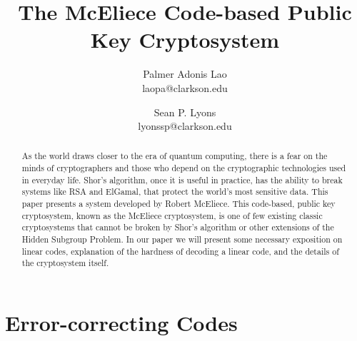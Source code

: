 \documentclass[15pt]{article}
\theoremstyle{definition}
\begin{document}
\title{The McEliece Code-based Public Key Cryptosystem}

\author{Palmer Adonis Lao\\
 laopa@clarkson.edu\\
\and
Sean P. Lyons\\
lyonssp@clarkson.edu\\}
\maketitle
\thispagestyle{empty}

\begin{abstract}
As the world draws closer to the era of quantum computing, there is a fear on the minds of cryptographers and those who depend on the cryptographic technologies used in everyday life. Shor's algorithm, once it is useful in practice, has the ability to break systems like RSA and ElGamal, that protect the world's most sensitive data. This paper presents a system developed by Robert McEliece.  This code-based, public key cryptosystem, known as the McEliece cryptosystem, is one of few existing classic cryptosystems that cannot be broken by Shor's algorithm or other extensions of the Hidden Subgroup Problem.  In our paper we will present some necessary exposition on linear codes, explanation of the hardness of decoding a linear code, and the details of the cryptosystem itself.   
\end{abstract}

\section{Error-correcting Codes}
\end{document}
